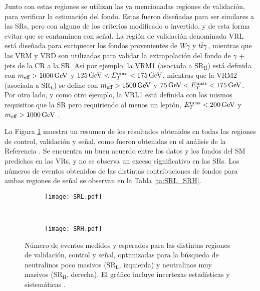Junto con estas regiones se utilizan las ya mencionadas regiones de validación, para verificar la estimación del fondo. Estas fueron diseñadas para ser similares a las SRs, pero con alguno de los criterios modificado o invertido, y de esta forma evitar que se contaminen con señal. La región de validación denominada VRL está diseñada para enriquecer los fondos provenientes de $W\gamma$ y $t \overline{t}\gamma$, mientras que las VRM y VRD son utilizadas para validar la extrapolación del fondo de $\gamma$ + jets de la CR a la SR. Así por ejemplo, la VRM1 (asociada a SR$_{\text{H}}$) está definida con $m_{\text{eff}}>1000\, \mathrm{GeV}$ y $125\, \mathrm{GeV}<E_{T}^{\text{miss}}<175\, \mathrm{GeV}$, mientras que la VRM2 (asociada a SR$_{\text{L}}$) se define con $m_{\text{eff}}>1500\, \mathrm{GeV}$ y $75\, \mathrm{GeV}<E_{T}^{\text{miss}}<175\, \mathrm{GeV}$. Por otro lado, y como otro ejemplo, la VRL1 está definida con los mismos requisitos que la SR pero requiriendo al menos un leptón, $E_{T}^{\text{miss}}<200\, \mathrm{GeV}$ y $m_{\text{eff}}>1000\, \mathrm{GeV}$ \cite{ATLAS:2016fks}.






La Figura \ref{SRL_SRH} muestra un resumen de los resultados obtenidos en todas las regiones de control, validación y señal, como fueron obtenidas en el análisis de la Referencia \cite{ATLAS:2016fks}. Se encuentra un buen acuerdo entre los datos y los fondos del SM predichos en las VRs, y no se observa un exceso significativo en las SRs. Los números de eventos obtenidos de las distintas contribuciones de fondos para ambas regiones de señal se observan en la Tabla \ref{ta:SRL_SRH}. 

\begin{figure}

	\begin{subfigure}{0.5\textwidth}
		\texttt{[image: SRL.pdf]} 
	\end{subfigure}
	~
	\begin{subfigure}{0.5\textwidth}
		\texttt{[image: SRH.pdf]}
	\end{subfigure}

	\caption{Número de eventos medidos y esperados para las distintas regiones de validación, control y señal, optimizadas para la búsqueda de neutralinos poco masivos (SR$_{\text{L}}$, izquierda) y neutralinos muy masivos (SR$_{\text{H}}$, derecha). El gráfico incluye incertezas estadísticas y sistemáticas \cite{ATLAS:2016fks}.}
\label{SRL_SRH}
\end{figure}


